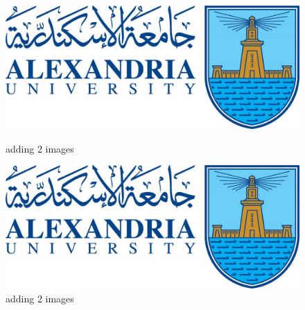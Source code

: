 \begin{figure}[!h]
  \centering
  \begin{minipage}[b]{0.47\textwidth}
    \includegraphics[width=\textwidth]{Images/ALEXU_1.jpg}
    \caption{adding 2 images }
  \end{minipage}
  \hfill
  \begin{minipage}[b]{0.47\textwidth}
    \includegraphics[width=\textwidth]{Images/ALEXU_1.jpg}
    \caption{adding 2 images}
  \end{minipage}
\end{figure}

